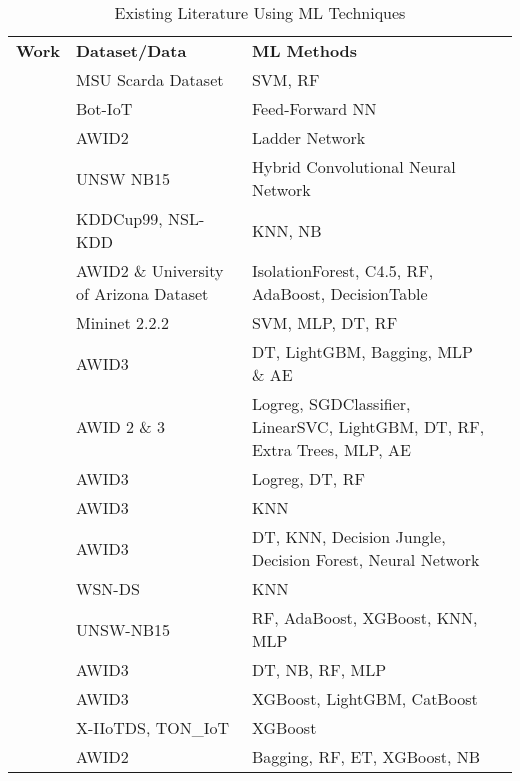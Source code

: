 \begin{table}[H]
\caption{Existing Literature Using ML Techniques}
\label{table:ml_papers}
\begin{tabular}{p{3cm}p{3cm}p{6cm}l}
\cline{1-3}
\textbf{Work}  & \textbf{Dataset/Data}  & \textbf{ML Methods} \\ \cline{1-3}
\cite{8455962} & MSU Scarda Dataset & \multicolumn{1}{p{6cm}}{\raggedright SVM, RF} \\ \hline
\cite{Ge2019DeepLI} & Bot-IoT & \multicolumn{1}{p{6cm}}{\raggedright Feed-Forward NN} \\ \hline
\cite{8746576} & AWID2 & \multicolumn{1}{p{6cm}}{\raggedright Ladder Network} \\ \hline
\cite{smys2020hybrid} & UNSW NB15 & \multicolumn{1}{p{6cm}}{\raggedright Hybrid Convolutional Neural Network} \\ \hline
\cite{9074929} & KDDCup99, NSL-KDD & \multicolumn{1}{p{6cm}}{\raggedright KNN, NB} \\ \hline
\cite{9249426} & AWID2 \& University of Arizona Dataset & \multicolumn{1}{p{6cm}}{\raggedright IsolationForest, C4.5, RF, AdaBoost, DecisionTable}   \\ \hline
\cite{DBLP:journals/corr/abs-2110-04259} & Mininet 2.2.2 & \multicolumn{1}{p{6cm}}{\raggedright SVM, MLP, DT, RF} \\ \hline 
\cite{s22155633}  & AWID3 & \multicolumn{1}{p{6cm}}{\raggedright DT, LightGBM, Bagging, MLP \& AE}   \\ \hline
\cite{pick_quality_over} & AWID 2 \& 3 & \multicolumn{1}{p{6cm}}{\raggedright Logreg, SGDClassifier, LinearSVC, LightGBM, DT, RF, Extra Trees, MLP, AE} \\ \hline
\cite{pub.1154431160} & AWID3 & \multicolumn{1}{p{6cm}}{\raggedright Logreg, DT, RF } \\ \hline
\cite{10.1007/978-3-030-98457-1_1} & AWID3 & \multicolumn{1}{p{6cm}}{\raggedright KNN} \\ \hline
\cite{Mughaid2022} & AWID3 & \multicolumn{1}{p{6cm}}{\raggedright DT, KNN, Decision Jungle, Decision Forest, Neural Network} \\ \hline
\cite{s22041407} & WSN-DS & \multicolumn{1}{p{6cm}}{\raggedright KNN} \\ \hline
\cite{DHANYA202357} & UNSW-NB15 & \multicolumn{1}{p{6cm}}{\raggedright RF, AdaBoost, XGBoost, KNN, MLP} \\ \hline
\cite{electronics12112355} & AWID3 & \multicolumn{1}{p{6cm}}{\raggedright DT, NB, RF, MLP } \\ \hline
\cite{10.1145/3508398.3519360} & AWID3 & \multicolumn{1}{p{6cm}}{\raggedright XGBoost, LightGBM, CatBoost} \\ \hline
\cite{su14148707} & X-IIoTDS, TON\_IoT & \multicolumn{1}{p{6cm}}{\raggedright XGBoost} \\ \hline
\cite{electronics9101689} & AWID2 & \multicolumn{1}{p{6cm}}{\raggedright Bagging, RF, ET, XGBoost, NB} \\ \hline
\end{tabular}
\end{table}



